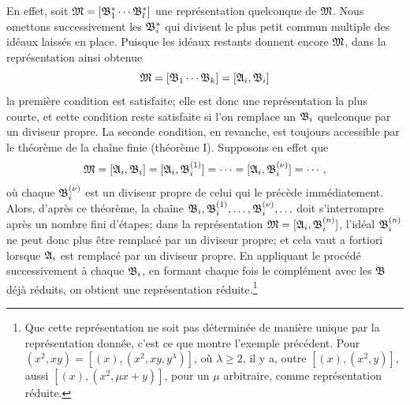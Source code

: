 En effet, soit $\mathfrak{M}=[\mathfrak{B}_1^*\cdots\mathfrak{B}_l^*]$ une représentation quelconque de $\mathfrak{M}$. Nous omettons successivement les $\mathfrak{B}_i^*$ qui divisent le plus petit commun multiple des idéaux laissés en place. Puisque les idéaux restants donnent encore $\mathfrak{M}$, dans la représentation ainsi obtenue
\[
 \mathfrak{M}=[\mathfrak{B}_1\cdots\mathfrak{B}_k]=[\mathfrak{A}_i,\mathfrak{B}_i]
\]
la première condition est satisfaite; elle est donc une représentation la plus courte, et cette condition reste satisfaite si l'on remplace un $\mathfrak{B}_i$ quelconque par un diviseur propre. La seconde condition, en revanche, est toujours accessible par le théorème de la chaîne finie (théorème I). Supposons en effet que
\[
 \mathfrak{M}=[\mathfrak{A}_i,\mathfrak{B}_i]=[\mathfrak{A}_i,\mathfrak{B}_i^{(1)}]
 =\cdots=[\mathfrak{A}_i,\mathfrak{B}_i^{(\nu)}]=\cdots,
\]
où chaque $\mathfrak{B}_i^{(\nu)}$ est un diviseur propre de celui qui le précède immédiatement. Alors, d'après ce théorème, la chaîne $\mathfrak{B}_i,\mathfrak{B}_i^{(1)},\ldots,\mathfrak{B}_i^{(\nu)},\ldots$ doit s'interrompre après un nombre fini d'étapes; dans la représentation $\mathfrak{M}=[\mathfrak{A}_i,\mathfrak{B}_i^{(n)}]$, l'idéal $\mathfrak{B}_i^{(n)}$ ne peut donc plus être remplacé par un diviseur propre; et cela vaut a fortiori lorsque $\mathfrak{A}_i$ est remplacé par un diviseur propre. En appliquant le procédé successivement à chaque $\mathfrak{B}_i$, en formant chaque fois le complément avec les $\mathfrak{B}$ déjà réduits, on obtient une représentation réduite.\footnote{Que cette représentation ne soit pas déterminée de manière unique par la représentation donnée, c'est ce que montre l'exemple précédent. Pour $(x^2,xy)=[(x),(x^2,xy,y^\lambda)]$, où $\lambda\ge2$, il y a, outre $[(x),(x^2,y)]$, aussi $[(x),(x^2,\mu x+y)]$, pour un $\mu$ arbitraire, comme représentation réduite.}

